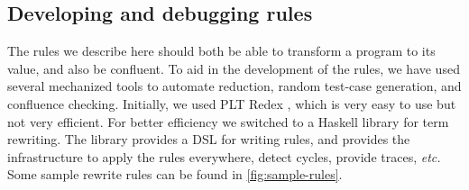 \documentclass[acmsmall]{acmart}
\newcommand{\etc}{\emph{etc.}\xspace}
\begin{document}
\subsection{Developing and debugging rules}\label{sec:testing}
The rules we describe here should both be able to transform a program to its value,
and also be confluent.
To aid in the development of the rules, we have used several mechanized tools to automate
reduction, random test-case generation, and confluence checking.
Initially, we used PLT Redex \cite{pltredex}, which is very easy to use but not very efficient.
For better efficiency we switched to a Haskell library for term
rewriting.
The library provides a DSL for writing rules, and provides the infrastructure
to apply the rules everywhere, detect cycles, provide traces, \etc
Some sample rewrite rules can be found in \cref{fig:sample-rules}.
\end{document}
